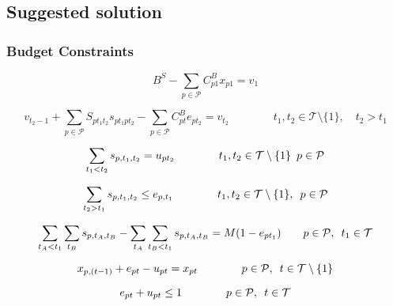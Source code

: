 \subsection{Suggested solution}

\subsubsection{Budget Constraints}

\begin{equation} 
    B^{S} - \sum_{p \in \mathcal{P}} C_{p1}^{B}x_{p1} = v_{1}
\end{equation}

\begin{equation} 
    v_{t_{2}-1} + \sum_{p \in \mathcal{P}}S_{pt_{1}t_{2}}s_{pt_{1}pt_{2}} - \sum_{p \in \mathcal{P}}C_{pt}^{B}e_{pt_{2}} = v_{t_{2}} \qquad\qquad t_{1}, t_{2} \in \mathcal{T}\setminus\{1\}, \quad t_{2} > t_{1}
\end{equation}

\begin{equation}
\sum_{t_{1} < t_{2}} s_{p,t_{1},t_{2}} = u_{pt_{2}}    \qquad\qquad t_{1}, t_{2} \in \mathcal{T}\setminus\{1\} \enskip p \in \mathcal{P}
\end{equation}

\begin{equation}
    \sum_{t_{2} > t_{1}} s_{p,t_{1},t_{2}} \leq e_{p,t_{1}} \qquad\qquad t_{1}, t_{2} \in \mathcal{T}\setminus\{1\}, \enskip p \in \mathcal{P}
\end{equation}

\begin{equation}
    \sum_{t_{A} < t_{1}} \sum_{t_{B}} s_{p,t_{A},t_{B}} -     \sum_{t_{A}} \sum_{t_{B} < t_{1}} s_{p,t_{A},t_{B}} = M(1-e_{pt_{1}}) \quad\quad p \in \mathcal{P}, \enskip t_{1} \in \mathcal{T}
\end{equation}

\begin{equation} 
  x_{p,(t-1)} + e_{pt} - u_{pt} = x_{pt} \qquad\qquad p \in \mathcal{P}, \enskip t \in \mathcal{T}\setminus\{1\} 
\end{equation}

\begin{equation} 
   e_{pt} + u_{pt} \leq 1  \qquad\qquad p \in \mathcal{P}, \enskip t \in \mathcal{T} 
\end{equation}